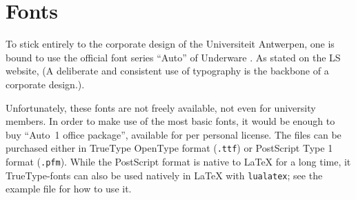 \section{Fonts}

To stick entirely to the corporate design of the Universiteit Antwerpen, one is
bound to use the official font series \enquote{Auto} of Underware
\cite{Underware::ATI}. As stated on the LS website,  (A deliberate and consistent use of typography is the backbone of a
corporate design.).

Unfortunately, these fonts are not freely available, not even for university
members. In order to make use of the most basic fonts, it would be enough to
buy \enquote{Auto~1 office package}, available for  per personal
license. The files can be purchased either in TrueType OpenType format
(\lstinline!.ttf!) or PostScript Type 1 format (\lstinline!.pfm!). While the
PostScript format is native to \LaTeX{} for a long time, it TrueType-fonts can
also be used natively in \LaTeX{} with \lstinline!lualatex!; see the example
file for how to use it.

